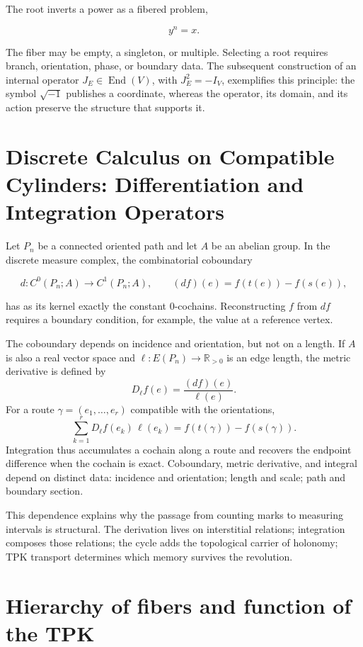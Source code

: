 The root inverts a power as a fibered problem,

\[
 y^n=x.
\]

The fiber may be empty, a singleton, or multiple. Selecting a root requires branch, orientation, phase, or boundary data. The subsequent construction of an internal operator \(J_E\in\operatorname{End}(V)\), with \(J_E^2=-I_V\), exemplifies this principle: the symbol \(\sqrt{-1}\) publishes a coordinate, whereas the operator, its domain, and its action preserve the structure that supports it.

\section{Discrete Calculus on Compatible Cylinders: Differentiation and Integration Operators}

Let \(P_n\) be a connected oriented path and let \(A\) be an abelian group. In the
discrete measure complex, the combinatorial coboundary

\[
 d:C^0(P_n;A)\longrightarrow C^1(P_n;A),
 \qquad (df)(e)=f(t(e))-f(s(e)),
\]

has as its kernel exactly the constant \(0\)-cochains. Reconstructing
\(f\) from \(df\) requires a boundary condition, for example, the value at a
reference vertex.

The coboundary depends on incidence and orientation, but not on a
length. If \(A\) is also a real vector space and
\(\ell:E(P_n)\to\mathbb R_{>0}\) is an edge length, the metric
derivative is defined by
\[
 D_\ell f(e)=\frac{(df)(e)}{\ell(e)}.
\]
For a route \(\gamma=(e_1,\ldots,e_r)\) compatible with the orientations,
\begin{equation}
 \sum_{k=1}^r D_\ell f(e_k)\,\ell(e_k)
 =f(t(\gamma))-f(s(\gamma)).
 \label{eq:integracion-derivada-metrica-rev2}
\end{equation}
Integration thus accumulates a cochain along a route and recovers the
endpoint difference when the cochain is exact. Coboundary, metric derivative,
and integral depend on distinct data: incidence and orientation; length and
scale; path and boundary section.

This dependence explains why the passage from counting marks to measuring intervals
is structural. The derivation lives on interstitial relations;
integration composes those relations; the cycle adds the topological carrier of
holonomy; TPK transport determines which memory survives the revolution.

\section{Hierarchy of fibers and function of the TPK}

